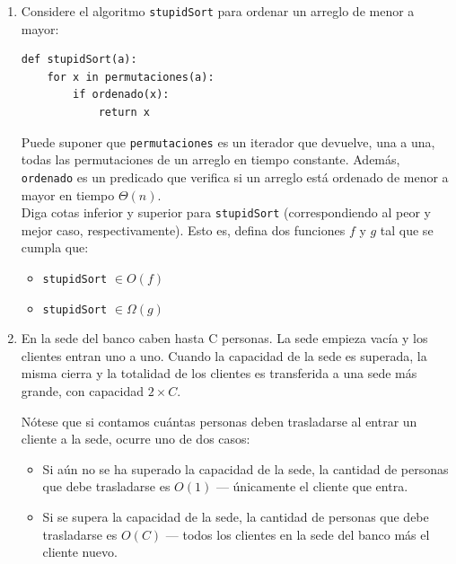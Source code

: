 \documentclass[letterpaper, 12pt]{article}
\begin{document}
\begin{enumerate}


\item Considere el algoritmo \texttt{stupidSort} para ordenar un arreglo de menor a
mayor: \\

\begin{verbatim}
def stupidSort(a):
    for x in permutaciones(a):
        if ordenado(x):
            return x
\end{verbatim}

Puede suponer que \texttt{permutaciones} es un iterador que devuelve, una a una, todas las permutaciones de un arreglo en tiempo constante. Además, \texttt{ordenado} es un predicado que verifica si un arreglo está ordenado de menor a mayor en tiempo $\Theta(n)$. \\

Diga cotas inferior y superior para \texttt{stupidSort} (correspondiendo al peor y mejor caso, respectivamente). Esto es, defina dos funciones $f$ y $g$ tal que se cumpla que: \\

\begin{multicols}{2}
    \begin{itemize}
        \item \texttt{stupidSort} $\in O(f)$
        \item \texttt{stupidSort} $\in \Omega(g)$
    \end{itemize}
\end{multicols}

\item  En la sede del banco caben hasta C personas. La sede empieza vacía y los
clientes entran uno a uno. Cuando la capacidad de la sede es superada, la misma cierra y la totalidad de los clientes es transferida a una sede más grande, con capacidad $2 \times C$.

Nótese que si contamos cuántas personas deben trasladarse al entrar un cliente a la sede, ocurre uno de dos casos:


\begin{itemize}
    \item Si aún no se ha superado la capacidad de la sede, la cantidad de personas que debe trasladarse es $O(1)$ — únicamente el cliente que entra.
    \item Si se supera la capacidad de la sede, la cantidad de personas que debe trasladarse es $O(C)$ — todos los clientes en la sede del banco más el cliente nuevo.
\end{itemize}


\end{enumerate}
\end{document}
